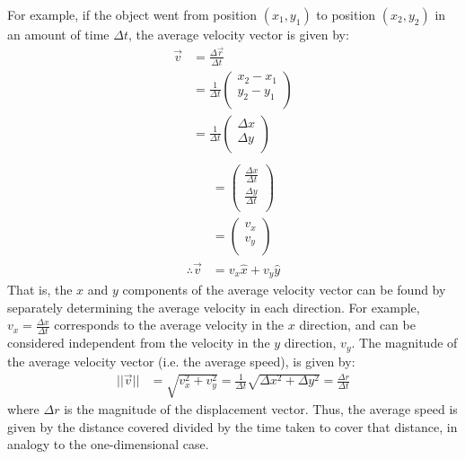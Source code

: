 For example, if the object went from position $(x_1,y_1)$ to position $(x_2,y_2)$ in an amount of time $\Delta t$, the average velocity vector is given by:
\begin{align*}
\vec v &= \frac{\Delta \vec r}{\Delta t}\\
&=\frac{1}{\Delta t}\begin{pmatrix}
           x_2-x_1 \\
           y_2-y_1 \\
         \end{pmatrix}\\
 &=\frac{1}{\Delta t}\begin{pmatrix}
           \Delta x \\
           \Delta y \\
         \end{pmatrix}\\     
\end{align*}
\begin{align*}
 &=\begin{pmatrix}
           \frac{\Delta x}{\Delta t} \\
           \frac{\Delta y}{\Delta t}\\
         \end{pmatrix}\\       
 &=\begin{pmatrix}
           v_x \\
           v_y \\
         \end{pmatrix}\\    
\therefore \vec v &= v_x\hat x+v_y\hat y                     
\end{align*}
That is, the $x$ and $y$ components of the average velocity vector can be found by separately determining the average velocity in each direction. For example, $v_x=\frac{\Delta x}{\Delta t}$ corresponds to the average velocity in the $x$ direction, and can be considered independent from the velocity in the $y$ direction, $v_y$. The magnitude of the average velocity vector (i.e. the average speed), is given by:
\begin{align*}
||\vec v||&=\sqrt{v_x^2+v_y^2}=\frac{1}{\Delta t}\sqrt{\Delta x^2+\Delta y^2}=\frac{\Delta r}{\Delta t}
\end{align*}
where $\Delta r$ is the magnitude of the displacement vector. Thus, the average speed is given by the distance covered divided by the time taken to cover that distance, in analogy to the one-dimensional case.

